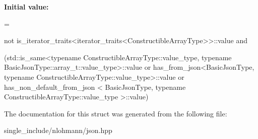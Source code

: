 {\bfseries Initial value\+:}
\begin{DoxyCode}
=
        
        
        
        
        
        not is\_iterator\_traits<iterator\_traits<ConstructibleArrayType>>::value and

        (std::is\_same<\textcolor{keyword}{typename} ConstructibleArrayType::value\_type,
         \textcolor{keyword}{typename} BasicJsonType::array\_t::value\_type>::value or
         has\_from\_json<BasicJsonType,
         \textcolor{keyword}{typename} ConstructibleArrayType::value\_type>::value or
         has\_non\_default\_from\_json <
         BasicJsonType, \textcolor{keyword}{typename} ConstructibleArrayType::value\_type >::value)
\end{DoxyCode}


The documentation for this struct was generated from the following file\+:\begin{DoxyCompactItemize}
\item 
single\+\_\+include/nlohmann/json.\+hpp\end{DoxyCompactItemize}
